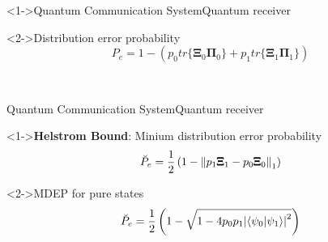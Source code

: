 \begin{frame}<1->{Quantum Communication System}{Quantum receiver}
    \begin{block}<2->{Distribution error probability}
        \begin{equation*}
            P_e=1-\left(p_0 tr\{\pmb{\Xi}_0\pmb{\Pi}_0\}+p_1 tr\{\pmb{\Xi}_1\pmb{\Pi}_1\}\right)
        \end{equation*}
    \end{block}
    \ \mbox{} \\ \mbox{} 
\end{frame}

\begin{frame}{Quantum Communication System}{Quantum receiver}
    \begin{block}<1->{\textbf{Helstrom Bound}: Minium distribution error probability}
        \begin{equation*}
            \breve{P}_e = \frac{1}{2} \left(1-\norm{p_1 \pmb{\Xi}_1 - p_0 \pmb{\Xi}_0}_1 \right)
        \end{equation*}
    \end{block}
    \begin{block}<2->{MDEP for pure states}
        \begin{equation*}
            \breve{P}_e = \frac{1}{2} \left(1- \sqrt{1-4 p_0 p_1 \absolutevalue{
                \braket{\psi_0}{\psi_1}}^2}\right)
        \end{equation*}
    \end{block}
\end{frame}
